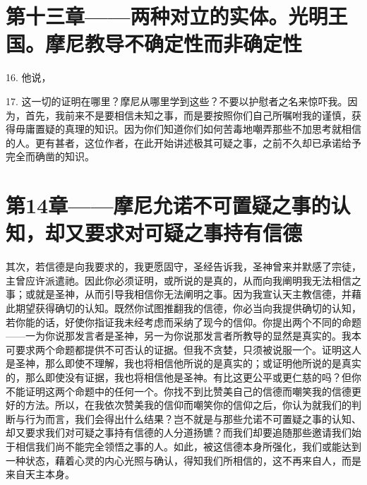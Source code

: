 \section{第十三章——两种对立的实体。光明王国。摩尼教导不确定性而非确定性}

16. 他说，\par

17. 这一切的证明在哪里？摩尼从哪里学到这些？不要以护慰者之名来惊吓我。因为，首先，我前来不是要相信未知之事，而是要按照你们自己所嘱咐我的谨慎，获得毋庸置疑的真理的知识。因为你们知道你们如何苦毒地嘲弄那些不加思考就相信的人。更有甚者，这位作者，在此开始讲述极其可疑之事，之前不久却已承诺给予完全而确凿的知识。\par


\section{第14章——摩尼允诺不可置疑之事的认知，却又要求对可疑之事持有信德}

其次，若信德是向我要求的，我更愿固守，圣经告诉我，圣神曾来并默感了宗徒，主曾应许派遣祂。因此你必须证明，或所说的是真的，从而向我阐明我无法相信之事；或就是圣神，从而引导我相信你无法阐明之事。因为我宣认天主教信德，并藉此期望获得确切的认知。既然你试图推翻我的信德，你必当向我提供确切的认知，若你能的话，好使你指证我未经考虑而采纳了现今的信仰。你提出两个不同的命题——一为你说那发言者是圣神，另一为你说那发言者所教导的显然是真实的。我本可要求两个命题都提供不可否认的证据。但我不贪婪，只须被说服一个。证明这人是圣神，那么即使不理解，我也将相信他所说的是真实的；或证明他所说的是真实的，那么即使没有证据，我也将相信他是圣神。有比这更公平或更仁慈的吗？但你不能证明这两个命题中的任何一个。你找不到比赞美自己的信德而嘲笑我的信德更好的方法。所以，在我依次赞美我的信仰而嘲笑你的信仰之后，你认为就我们的判断与行为而言，我们会得出什么结果？岂不就是与那些允诺不可置疑之事的认知、却又要求我们对可疑之事持有信德的人分道扬镳？而我们却要追随那些邀请我们始于相信我们尚不能完全领悟之事的人。如此，被这信德本身所强化，我们或能达到一种状态，藉着心灵的内心光照与确认，得知我们所相信的，这不再来自人，而是来自天主本身。\par


